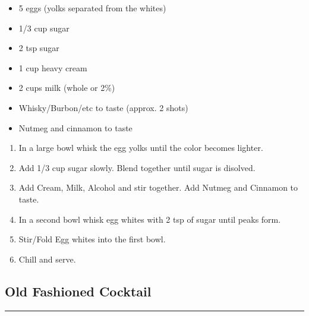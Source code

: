 \documentclass{article}
\begin{document}
\begin{framed}
    \begin{itemize}
        \item 5 eggs (yolks separated from the whites)
        \item 1/3 cup sugar
        \item 2 tsp sugar
        \item 1 cup heavy cream
        \item 2 cups milk (whole or 2\%)
        \item Whisky/Burbon/etc to taste (approx. 2 shots)
        \item Nutmeg and cinnamon to taste
    \end{itemize}
\end{framed}

\begin{enumerate}
    \item 
        In a large bowl whisk the egg yolks until the color becomes lighter.
    \item 
        Add 1/3 cup sugar slowly. Blend together until sugar is disolved. 
    \item 
        Add Cream, Milk, Alcohol and stir together. Add Nutmeg and Cinnamon to taste.  
    \item 
        In a second bowl whisk egg whites with 2 tsp of sugar until peaks form. 
    \item 
        Stir/Fold Egg whites into the first bowl. 
    \item 
        Chill and serve. 
\end{enumerate}
\newpage

\subsection{Old Fashioned Cocktail} 
\noindent\rule[0.5ex]{\linewidth}{1pt}

\end{document}
